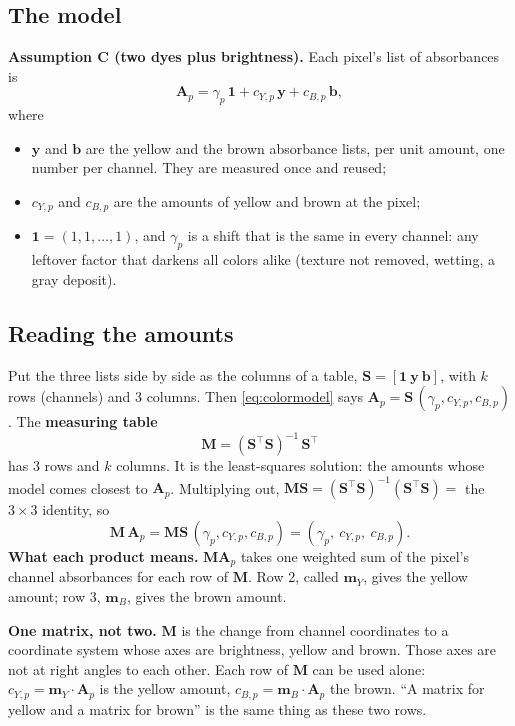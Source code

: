 \documentclass[11pt,letter]{article}
\newcommand{\one}{\mathbf{1}}
\newcommand{\vy}{\mathbf{y}}
\newcommand{\vb}{\mathbf{b}}
\newcommand{\vA}{\mathbf{A}}
\newcommand{\mS}{\mathbf{S}}
\newcommand{\mM}{\mathbf{M}}
\newcommand{\vm}{\mathbf{m}}
\begin{document}
\subsection{The model}

\textbf{Assumption C (two dyes plus brightness).}  Each pixel's list of
absorbances is
\begin{equation}
  \vA_p = \gamma_p\,\one + c_{Y,p}\,\vy + c_{B,p}\,\vb ,
  \label{eq:colormodel}
\end{equation}
where
\begin{itemize}[nosep]
  \item $\vy$ and $\vb$ are the yellow and the brown absorbance lists, per
    unit amount, one number per channel.  They are measured once and
    reused;
  \item $c_{Y,p}$ and $c_{B,p}$ are the amounts of yellow and brown at the
    pixel;
  \item $\one = (1, 1, \dots, 1)$, and $\gamma_p$ is a shift that is the
    same in every channel: any leftover factor that darkens all colors
    alike (texture not removed, wetting, a gray deposit).
\end{itemize}

\subsection{Reading the amounts}

Put the three lists side by side as the columns of a table,
$\mS = [\one\ \vy\ \vb]$, with $k$ rows (channels) and 3 columns.  Then
\eqref{eq:colormodel} says $\vA_p = \mS\,(\gamma_p, c_{Y,p}, c_{B,p})$.  The
\textbf{measuring table}
\begin{equation}
  \mM = (\mS^\top \mS)^{-1}\, \mS^\top
\end{equation}
has 3 rows and $k$ columns.  It is the least-squares solution: the amounts
whose model comes closest to $\vA_p$.  Multiplying out,
$\mM\mS = (\mS^\top\mS)^{-1}(\mS^\top\mS) = $ the $3\times3$ identity, so
\begin{equation}
  \mM\,\vA_p = \mM\mS\,(\gamma_p, c_{Y,p}, c_{B,p})
             = (\gamma_p,\ c_{Y,p},\ c_{B,p}) .
\end{equation}
\textbf{What each product means.}  $\mM\vA_p$ takes one weighted sum of the
pixel's channel absorbances for each row of $\mM$.  Row 2, called $\vm_Y$,
gives the yellow amount; row 3, $\vm_B$, gives the brown amount.

\textbf{One matrix, not two.}  $\mM$ is the change from channel
coordinates to a coordinate system whose axes are brightness, yellow and
brown.  Those axes are not at right angles to each other.  Each row of
$\mM$ can be used alone: $c_{Y,p} = \vm_Y \cdot \vA_p$ is the yellow amount,
$c_{B,p} = \vm_B \cdot \vA_p$ the brown.  ``A matrix for yellow and a
matrix for brown'' is the same thing as these two rows.
\end{document}
